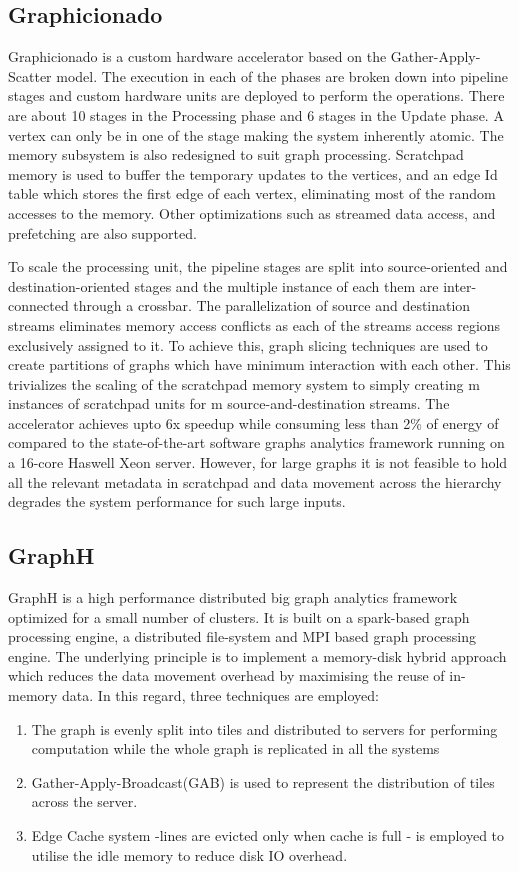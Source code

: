  \subsection{Graphicionado}
 Graphicionado \cite{Graphicionado} is a custom hardware accelerator based on the Gather-Apply-Scatter model. The execution in each of the phases are broken down into pipeline stages and custom hardware units are deployed to perform the operations. There are about 10 stages in the Processing phase and 6 stages in the Update phase. A vertex can only be in one of the stage making the system inherently atomic. The memory subsystem is also redesigned to suit graph processing. Scratchpad memory is used to buffer the temporary updates to the vertices, and an edge Id table which stores the first edge of each vertex, eliminating most of the random accesses to the memory. Other optimizations such as streamed data access, and prefetching are also supported. 
 
 To scale the processing unit, the pipeline stages are split into source-oriented and destination-oriented stages and the multiple instance of each them are inter-connected through a crossbar. The parallelization of source and destination streams eliminates memory access conflicts as each of the streams access regions exclusively assigned to it. To achieve this, graph slicing techniques are used to create partitions of graphs which have minimum interaction with each other. This trivializes the scaling of the scratchpad memory system to simply creating m instances of scratchpad units for m source-and-destination streams. The accelerator achieves upto 6x speedup while consuming less than 2\% of energy of compared to the state-of-the-art software graphs analytics framework running on a 16-core Haswell Xeon server. However, for large graphs it is not feasible to hold all the relevant metadata in scratchpad and data movement across the hierarchy degrades the system performance for such large inputs.
 
 \subsection{GraphH} GraphH \cite{GraphH} is a high performance distributed big graph analytics framework optimized for a small number of clusters. It is built on a spark-based graph processing engine, a distributed file-system and MPI based graph processing engine. The underlying principle is to implement a memory-disk hybrid approach which reduces the data movement overhead by maximising the reuse of in-memory data. In this regard, three techniques are employed:
 \begin{enumerate}
  \item The graph is evenly split into tiles and distributed to servers for performing computation while the whole graph is replicated in all the systems
  \item Gather-Apply-Broadcast(GAB) is used to represent the distribution of tiles across the server. 
  \item Edge Cache system -lines are evicted only when cache is full - is employed to utilise the idle memory to reduce disk IO overhead.
 \end{enumerate}

